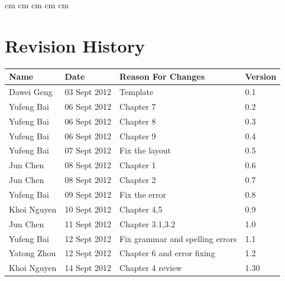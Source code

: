 \documentclass[11pt, a4paper]{report}
\begin{document}
 cm
 cm
 cm
 cm
 cm

\tableofcontents






\clearpage
\section*{Revision History}
\begin{tabular}{| l | l | l | l | }
\hline
Name				  &	Date        	&	Reason For Changes                  	  	&	Version     	\\ \hline
Dawei Geng		&	03 Sept 2012   &	Template			                    	      &	0.1 	    	  \\ \hline
Yufeng Bai		&	06 Sept 2012	  &	Chapter 7							                    &	0.2		        \\ \hline
Yufeng Bai		&	06 Sept 2012	  &	Chapter 8							                    &	0.3		        \\ \hline
Yufeng Bai		&	06 Sept 2012	  &	Chapter 9							                    &	0.4		        \\ \hline
Yufeng Bai		&	07 Sept 2012	  &	Fix the layout						                &	0.5		        \\ \hline
Jun Chen    	& 08 Sept 2012 	&	Chapter 1                  		  	        &	0.6     	    \\ \hline
Jun Chen   		&	08 Sept 2012 	&	Chapter 2                 	  			      &	0.7           \\ \hline
Yufeng Bai		&	09 Sept 2012	  &	Fix the error						                  &	0.8		        \\ \hline
Khoi Nguyen 	&	10 Sept 2012   &	Chapter 4,5             				          &	0.9     	    \\ \hline
Jun Chen			&	11 Sept 2012	  &	Chapter 3.1,3.2                	  		    &	1.0    	      \\ \hline
Yufeng Bai		&	12 Sept 2012	  &	Fix grammar and spelling errors			      &	1.1		        \\ \hline
Yatong Zhou   &	12 Sept 2012   &	Chapter 6 and error fixing				        &	1.2     	    \\ \hline
Khoi Nguyen   &	14 Sept 2012   &	Chapter 4 review                          &	1.30          \\ \hline

\end{tabular}
\end{document}
